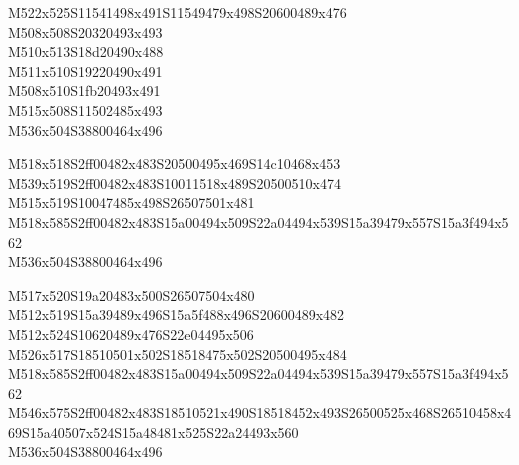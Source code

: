 \documentclass{article}
\begin{document}
\begin{multicols}{5}
\begin{center}
M522x525S11541498x491S11549479x498S20600489x476 %
\\M508x508S20320493x493 %
\\M510x513S18d20490x488 %
\\M511x510S19220490x491 %
\\M508x510S1fb20493x491 %
\\M515x508S11502485x493 %
\\M536x504S38800464x496 %

M518x518S2ff00482x483S20500495x469S14c10468x453 %
\\M539x519S2ff00482x483S10011518x489S20500510x474 %
\\M515x519S10047485x498S26507501x481 %
\\M518x585S2ff00482x483S15a00494x509S22a04494x539S15a39479x557S15a3f494x562 %
\\M536x504S38800464x496 %

M517x520S19a20483x500S26507504x480 %
\\M512x519S15a39489x496S15a5f488x496S20600489x482 %
\\M512x524S10620489x476S22e04495x506 %
\\M526x517S18510501x502S18518475x502S20500495x484 %
\\M518x585S2ff00482x483S15a00494x509S22a04494x539S15a39479x557S15a3f494x562 %
\\M546x575S2ff00482x483S18510521x490S18518452x493S26500525x468S26510458x469S15a40507x524S15a48481x525S22a24493x560 %
\\M536x504S38800464x496 %

\end{center}
\end{multicols}
\end{document}
